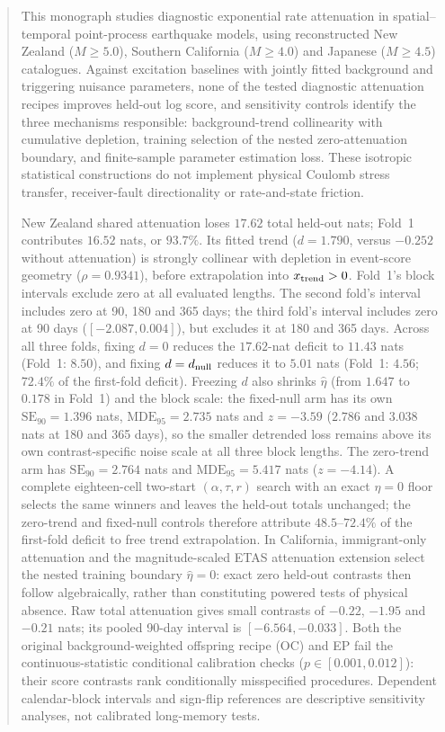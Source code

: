 \begin{abstract}
This monograph studies diagnostic exponential rate attenuation in spatial--temporal point-process earthquake models, using reconstructed New Zealand ($M\geq5.0$), Southern California ($M\geq4.0$) and Japanese ($M\geq4.5$) catalogues. Against excitation baselines with jointly fitted background and triggering nuisance parameters, none of the tested diagnostic attenuation recipes improves held-out log score, and sensitivity controls identify the three mechanisms responsible: background-trend collinearity with cumulative depletion, training selection of the nested zero-attenuation boundary, and finite-sample parameter estimation loss. These isotropic statistical constructions do not implement physical Coulomb stress transfer, receiver-fault directionality or rate-and-state friction.

New Zealand shared attenuation loses $17.62$ total held-out nats; Fold~1 contributes $16.52$ nats, or $93.7\%$. Its fitted trend ($d=1.790$, versus $-0.252$ without attenuation) is strongly collinear with depletion in event-score geometry ($\rho=0.9341$), before extrapolation into $x_{\rm trend}>0$. Fold~1's block intervals exclude zero at all evaluated lengths. The second fold's interval includes zero at 90, 180 and 365 days; the third fold's interval includes zero at 90 days ($[-2.087,0.004]$), but excludes it at 180 and 365 days. Across all three folds, fixing $d=0$ reduces the $17.62$-nat deficit to $11.43$ nats (Fold~1: $8.50$), and fixing $d=d_{\rm null}$ reduces it to $5.01$ nats (Fold~1: $4.56$; $72.4\%$ of the first-fold deficit). Freezing $d$ also shrinks $\hat\eta$ (from $1.647$ to $0.178$ in Fold~1) and the block scale: the fixed-null arm has its own $\mathrm{SE}_{90}=1.396$ nats, $\mathrm{MDE}_{95}=2.735$ nats and $z=-3.59$ ($2.786$ and $3.038$ nats at 180 and 365 days), so the smaller detrended loss remains above its own contrast-specific noise scale at all three block lengths. The zero-trend arm has $\mathrm{SE}_{90}=2.764$ nats and $\mathrm{MDE}_{95}=5.417$ nats ($z=-4.14$). A complete eighteen-cell two-start $(\alpha,\tau,r)$ search with an exact $\eta=0$ floor selects the same winners and leaves the held-out totals unchanged; the zero-trend and fixed-null controls therefore attribute $48.5$--$72.4\%$ of the first-fold deficit to free trend extrapolation. In California, immigrant-only attenuation and the magnitude-scaled ETAS attenuation extension select the nested training boundary $\hat\eta=0$: exact zero held-out contrasts then follow algebraically, rather than constituting powered tests of physical absence. Raw total attenuation gives small contrasts of $-0.22$, $-1.95$ and $-0.21$ nats; its pooled 90-day interval is $[-6.564,-0.033]$. Both the original background-weighted offspring recipe (OC) and EP fail the continuous-statistic conditional calibration checks ($p\in[0.001,0.012]$): their score contrasts rank conditionally misspecified procedures. Dependent calendar-block intervals and sign-flip references are descriptive sensitivity analyses, not calibrated long-memory tests.


\end{abstract}
